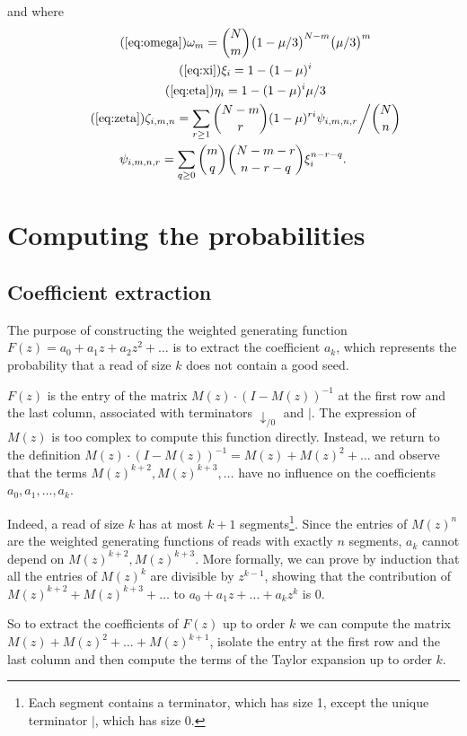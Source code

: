 \documentclass{article}
\begin{document}
and where
\begin{gather}
\tag{\ref{eq:omega}}
\omega_m = {N \choose m} \big(1 - \mu/3\big)^{N-m} \big(\mu/3\big)^m \\
\tag{\ref{eq:xi}}
\xi_i = 1-(1-\mu)^i \\
\tag{\ref{eq:eta}}
\eta_i = 1-(1-\mu)^i\mu/3 \\
\tag{\ref{eq:zeta}}
\zeta_{i,m,n} = \sum_{r\geq1} {N-m \choose r}
(1-\mu)^{ri} \psi_{i,m,n,r} \bigg/ {N \choose n} \\
\notag
\psi_{i,m,n,r} = \sum_{q \geq 0}{m \choose q}{N-m-r \choose n-r-q}
\xi_i^{n-r-q}.
\end{gather}


\section{Computing the probabilities}
\label{sec:compute}

\subsection{Coefficient extraction}
\label{sec:extract}

The purpose of constructing the weighted generating function $F(z) = a_0 +
a_1z + a_2z^2 + \ldots$ is to extract the coefficient $a_k$, which
represents the probability that a read of size $k$ does not contain a
good seed.

$F(z)$ is the entry of the matrix $M(z) \cdot (I-M(z))^{-1}$ at the first
row and the last column, associated with terminators $\downarrow_{/0}$ and
$|$. The expression of $M(z)$ is too complex to compute this function
directly. Instead, we return to the definition $M(z) \cdot (I-M(z))^{-1} =
M(z) + M(z)^2 + \ldots$ and observe that the terms $M(z)^{k+2},
M(z)^{k+3}, \ldots$ have no influence on the coefficients $a_0, a_1,
\ldots, a_k$.

Indeed, a read of size $k$ has at most $k+1$ segments\footnote{Each
segment contains a terminator, which has size 1, except the unique
terminator $|$, which has size 0.}. Since the entries of $M(z)^n$ are the
weighted generating functions of reads with exactly $n$ segments, $a_k$
cannot depend on $M(z)^{k+2}, M(z)^{k+3}$. More formally, we can prove by
induction that all the entries of $M(z)^k$ are divisible by $z^{k-1}$,
showing that the contribution of $M(z)^{k+2} + M(z)^{k+3} + \ldots$ to
$a_0 + a_1z + \ldots +a_kz^k$ is $0$.

So to extract the coefficients of $F(z)$ up to order $k$ we can compute
the matrix $M(z) + M(z)^2 + \ldots + M(z)^{k+1}$, isolate the entry at the
first row and the last column and then compute the terms of the Taylor
expansion up to order $k$.
\end{document}
